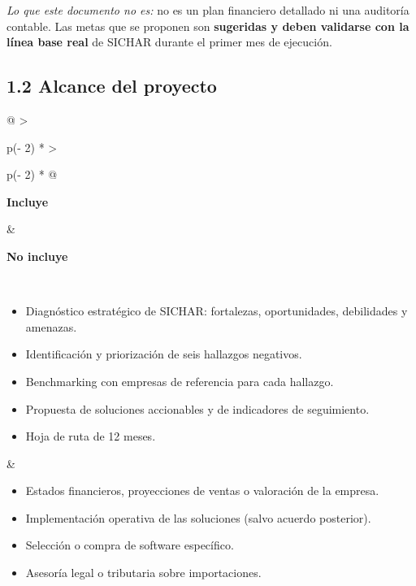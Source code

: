 \documentclass[11pt,a4paper]{article}
\begin{document}
\emph{Lo que este documento no es:} no es un plan financiero detallado ni una auditoría contable.
Las metas que se proponen son \textbf{sugeridas y deben validarse con la línea base real} de SICHAR
durante el primer mes de ejecución.


\hypertarget{alcance-del-proyecto}{%
\subsection{1.2 Alcance del proyecto}\label{alcance-del-proyecto}}

\begin{longtable}[]{@{}
  >{\raggedright\arraybackslash}p{(\columnwidth - 2\tabcolsep) * }
  >{\raggedright\arraybackslash}p{(\columnwidth - 2\tabcolsep) * }@{}}
\toprule\noalign{}
\begin{minipage}[b]{\linewidth}\raggedright
\textbf{Incluye}
\end{minipage} & \begin{minipage}[b]{\linewidth}\raggedright
\textbf{No incluye}
\end{minipage} \\
\midrule\noalign{}
\endfirsthead
\bottomrule\noalign{}
\endlastfoot
\begin{minipage}[t]{\linewidth}\raggedright
\begin{itemize}
\item
  Diagnóstico estratégico de SICHAR: fortalezas, oportunidades, debilidades y amenazas.
\item
  Identificación y priorización de seis hallazgos negativos.
\item
  Benchmarking con empresas de referencia para cada hallazgo.
\item
  Propuesta de soluciones accionables y de indicadores de seguimiento.
\item
  Hoja de ruta de 12 meses.
\end{itemize}
\end{minipage} & \begin{minipage}[t]{\linewidth}\raggedright
\begin{itemize}
\item
  Estados financieros, proyecciones de ventas o valoración de la empresa.
\item
  Implementación operativa de las soluciones (salvo acuerdo posterior).
\item
  Selección o compra de software específico.
\item
  Asesoría legal o tributaria sobre importaciones.
\end{itemize}
\end{minipage} \\
\end{longtable}
\end{document}
